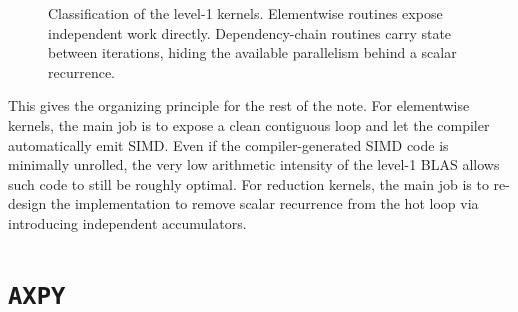 \documentclass[11pt]{article}
\begin{document}
\begin{figure}[h]

\caption{Classification of the level-1 kernels. Elementwise routines expose independent work directly. Dependency-chain routines carry state between iterations, hiding the available parallelism behind a scalar recurrence.}
\label{fig:l1-dependencies}
\end{figure}

This gives the organizing principle for the rest of the note. For elementwise kernels, the main 
job is to expose a clean contiguous loop and let the compiler automatically emit SIMD. Even if the 
compiler-generated SIMD code is minimally unrolled, the very low arithmetic intensity of the level-1 BLAS 
allows such code to still be roughly optimal. For reduction kernels, the main job is to re-design the 
implementation to remove scalar recurrence from the hot loop via introducing independent accumulators. 

\section{\texttt{AXPY}} \label{sec:axpy}
\end{document}
